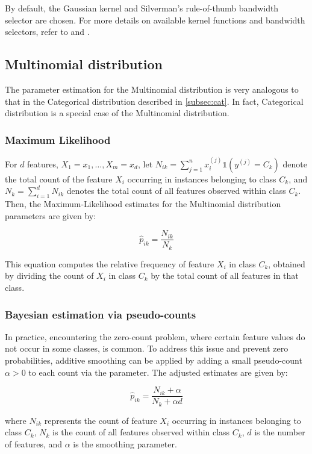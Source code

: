 \documentclass{article}\usepackage[]{graphicx}\usepackage[]{xcolor}
\begin{document}
By default, the Gaussian kernel and Silverman's rule-of-thumb bandwidth selector are chosen. For more details on available kernel functions and bandwidth selectors, refer to \textcolor{darkgreen}{{}} and \textcolor{darkgreen}{{}}.

\subsection{Multinomial distribution}

The parameter estimation for the Multinomial distribution is very analogous to that in the Categorical distribution described in \ref{subsec:cat}. In fact, Categorical distribution is a special case of the Multinomial distribution.

\subsubsection{Maximum Likelihood}

For $d$ features, $X_1=x_1, \ldots, X_m=x_d$, let $N_{ik} = \sum_{j=1}^n x_i^{(j)}\mathbb{1}(y^{(j)} = C_k)$ denote the total count of the feature $X_i$ occurring in instances belonging to class $C_k$, and $N_k = \sum_{i=1}^d N_{ik}$ denotes the total count of all features observed within class $C_k$. Then, the Maximum-Likelihood estimates for the Multinomial distribution parameters are given by:

\[
\hat{p}_{ik} = \frac{N_{ik}}{N_k}
\]

This equation computes the relative frequency of feature $X_i$ in class $C_k$, obtained by dividing the count of $X_i$ in class $C_k$ by the total count of all features in that class.

\subsubsection{Bayesian estimation via pseudo-counts}

In practice, encountering the zero-count problem, where certain feature values do not occur in some classes, is common. To address this issue and prevent zero probabilities, additive smoothing can be applied by adding a small pseudo-count $\alpha > 0$ to each count via the \textcolor{darkgreen}{{}} parameter. The adjusted estimates are given by:

\[
\hat{p}_{ik} = \frac{N_{ik} + \alpha}{N_k + \alpha d}
\]

where $N_{ik}$ represents the count of feature $X_i$ occurring in instances belonging to class $C_k$, $N_k$ is the count of all features observed within class $C_k$, $d$ is the number of features, and $\alpha$ is the smoothing parameter.
\end{document}
